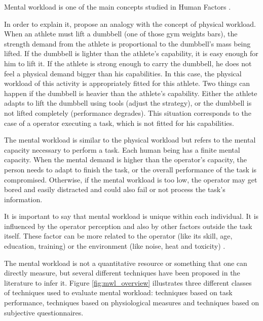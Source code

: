 Mental workload is one of the main concepts studied in Human Factors \cite{stanton2004handbook}.

In order to explain it,  propose an analogy with the concept of physical workload. When an athlete must lift a dumbbell (one of those gym weights bars), the strength demand from the athlete is proportional to the dumbbell's mass being lifted. If the dumbbell is lighter than the athlete's capability, it is easy enough for him to lift it. If the athlete is strong enough to carry the dumbbell, he does not feel a physical demand bigger than his capabilities. In this case, the physical workload of this activity is appropriately fitted for this athlete. Two things can happen if the dumbbell is heavier than the athlete's capability. Either the athlete adapts to lift the dumbbell using tools (adjust the strategy), or the dumbbell is not lifted completely (performance degrades). This situation corresponds to the case of a operator executing a task, which is not fitted for his capabilities.

The mental workload is similar to the physical workload but refers to the mental capacity necessary to perform a task. Each human being has a finite mental capacity. When the mental demand is higher than the operator's capacity, the person needs to adapt to finish the task, or the overall performance of the task is compromised. Otherwise, if the mental workload is too low, the operator may get bored and easily distracted and could also fail or not process the task's information.

It is important to say that mental workload is unique within each individual. It is influenced by the operator perception and also by other factors outside the task itself. These factor can be more related to the operator (like its skill, age, education, training) or the environment (like noise, heat and toxicity)  \cite{cain2007review, fallahi2016effects, cardoso2012evaluation}.

The mental workload is not a quantitative resource or something that one can directly measure, but several different techniques have been proposed in the literature to infer it. Figure \ref{fig:mwl_overview} illustrates three different classes of techniques used to evaluate mental workload: techniques based on task performance, techniques based on physiological measures and techniques based on subjective questionnaires.
        
        
    
